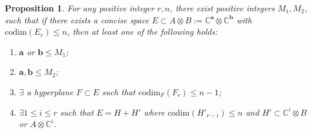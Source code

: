 \documentclass[10pt]{article} %
\newcommand{\aaa}{\mathbf{a}}
\newcommand{\bbb}{\mathbf{b}}
\newcommand{\BC}{\mathbb{C}}
\newcommand{\ot}{\otimes}
\newtheorem{prop}[thm]{Proposition}
\theoremstyle{definition}
\begin{document}
\begin{prop}\label{Ercodimnprop}
For any positive integer $r,n$, there exist positive integers $M_1,M_2$, such that if there exists a concise space $E\subset A\ot B:=\BC^{\aaa}\ot\BC^{\bbb}$ with $\mathrm{codim}(E_r)\leq n$, then at least one of the following holds:
\begin{enumerate}[(1)]
    \item $\aaa$ or $\bbb\leq M_1$;
    \item $\aaa,\bbb\leq M_2$;
    \item $\exists$ a hyperplane $F\subset E$ such that $\mathrm{codim}_F (F_r)\leq n-1$;
    \item $\exists 1\leq i\leq r$ such that $E=H+H'$ where $\mathrm{codim}(H'_{r-i})\leq n$ and $H'\subset \BC^i\ot B$ or $A\ot \BC^i$.
\end{enumerate}
\end{prop}
\end{document}
